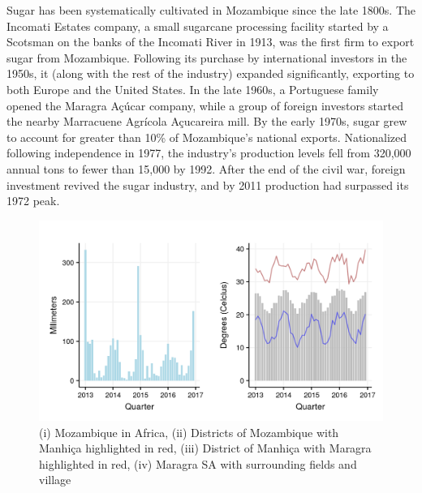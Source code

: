\documentclass[]{article}
\begin{document}
Sugar has been systematically cultivated in Mozambique since the late
1800s. The Incomati Estates company, a small sugarcane processing
facility started by a Scotsman on the banks of the Incomati River in
1913, was the first firm to export sugar from Mozambique. Following its
purchase by international investors in the 1950s, it (along with the
rest of the industry) expanded significantly, exporting to both Europe
and the United States. In the late 1960s, a Portuguese family opened the
Maragra Açúcar company, while a group of foreign investors started the
nearby Marracuene Agrícola Açucareira mill. By the early 1970s, sugar
grew to account for greater than 10\% of Mozambique's national exports.
Nationalized following independence in 1977, the industry's production
levels fell from 320,000 annual tons to fewer than 15,000 by 1992. After
the end of the civil war, foreign investment revived the sugar industry,
and by 2011 production had surpassed its 1972 peak.

\begin{figure}[!h]

{\centering \includegraphics{figures/unnamed-chunk-14-1} 

}

\caption{(i) Mozambique in Africa, (ii) Districts of Mozambique with Manhiça highlighted in red, (iii) District of Manhiça with Maragra highlighted in red, (iv) Maragra SA with surrounding fields and village}\label{fig:unnamed-chunk-14}
\end{figure}
\end{document}
